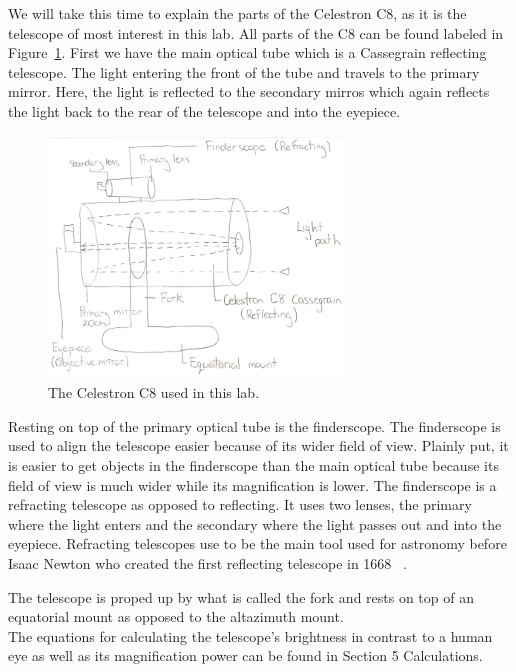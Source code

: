 \documentclass{article}
\begin{document}
We will take this time to explain the parts of the Celestron C8, as it is the telescope of most interest in this lab. All parts of the 
C8 can be found labeled in Figure~\ref{fig:telescope}. First we have the main optical tube which is a Cassegrain reflecting
telescope. The light entering the front of the tube and travels to the primary mirror. Here, the light is reflected to the
secondary mirros which again reflects the light back to the rear of the telescope and into the eyepiece.

\begin{figure}[h]
\centering
\includegraphics[width=0.7\textwidth]{images/telescope}
\caption{The Celestron C8 used in this lab.\label{fig:telescope}}
\end{figure}

Resting on top of the primary optical tube is the finderscope. The finderscope is used to align the telescope easier because of
its wider field of view. Plainly put, it is easier to get objects in the finderscope than the main optical tube because its field of
view is much wider while its magnification is lower. The finderscope is a refracting telescope as opposed to reflecting. It uses
two lenses, the primary where the light enters and the secondary where the light passes out and into the eyepiece. Refracting
telescopes use to be the main tool used for astronomy before Isaac Newton who created the first reflecting telescope in 1668
~\cite{Hall:67}.

The telescope is proped up by what is called the fork and rests on top of an equatorial mount as opposed to the altazimuth mount.\\

The equations for calculating the telescope's brightness in contrast to a human eye as well as its magnification power can be
found in Section 5 Calculations.\\
\end{document}

